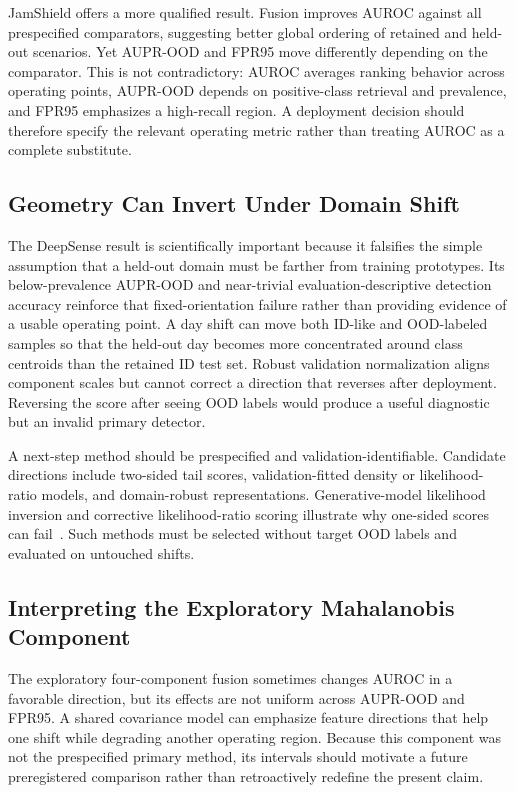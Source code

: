 JamShield offers a more qualified result. Fusion improves AUROC against all prespecified comparators, suggesting better global ordering of retained and held-out scenarios. Yet AUPR-OOD and FPR95 move differently depending on the comparator. This is not contradictory: AUROC averages ranking behavior across operating points, AUPR-OOD depends on positive-class retrieval and prevalence, and FPR95 emphasizes a high-recall region. A deployment decision should therefore specify the relevant operating metric rather than treating AUROC as a complete substitute.

\subsection{Geometry Can Invert Under Domain Shift}

The DeepSense result is scientifically important because it falsifies the simple assumption that a held-out domain must be farther from training prototypes. Its below-prevalence AUPR-OOD and near-trivial evaluation-descriptive detection accuracy reinforce that fixed-orientation failure rather than providing evidence of a usable operating point. A day shift can move both ID-like and OOD-labeled samples so that the held-out day becomes more concentrated around class centroids than the retained ID test set. Robust validation normalization aligns component scales but cannot correct a direction that reverses after deployment. Reversing the score after seeing OOD labels would produce a useful diagnostic but an invalid primary detector.

A next-step method should be prespecified and validation-identifiable. Candidate directions include two-sided tail scores, validation-fitted density or likelihood-ratio models, and domain-robust representations. Generative-model likelihood inversion and corrective likelihood-ratio scoring illustrate why one-sided scores can fail~\cite{nalisnick2019deep,ren2019likelihood}. Such methods must be selected without target OOD labels and evaluated on untouched shifts.

\subsection{Interpreting the Exploratory Mahalanobis Component}

The exploratory four-component fusion sometimes changes AUROC in a favorable direction, but its effects are not uniform across AUPR-OOD and FPR95. A shared covariance model can emphasize feature directions that help one shift while degrading another operating region. Because this component was not the prespecified primary method, its intervals should motivate a future preregistered comparison rather than retroactively redefine the present claim.

